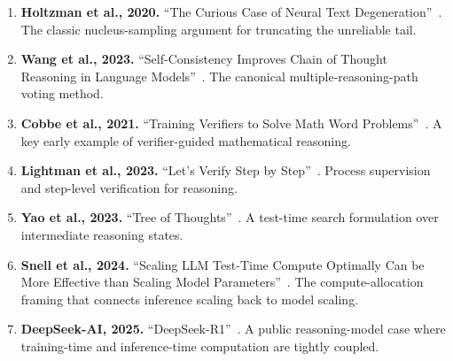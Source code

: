 \begin{enumerate}[nosep]
  \item \textbf{Holtzman et al., 2020.} ``The Curious Case of Neural Text Degeneration''~\cite{holtzman2020curious}. The classic nucleus-sampling argument for truncating the unreliable tail.
  \item \textbf{Wang et al., 2023.} ``Self-Consistency Improves Chain of Thought Reasoning in Language Models''~\cite{wang2022selfconsistency}. The canonical multiple-reasoning-path voting method.
  \item \textbf{Cobbe et al., 2021.} ``Training Verifiers to Solve Math Word Problems''~\cite{cobbe2021gsm8k}. A key early example of verifier-guided mathematical reasoning.
  \item \textbf{Lightman et al., 2023.} ``Let's Verify Step by Step''~\cite{lightman2023verify}. Process supervision and step-level verification for reasoning.
  \item \textbf{Yao et al., 2023.} ``Tree of Thoughts''~\cite{yao2023tree}. A test-time search formulation over intermediate reasoning states.
  \item \textbf{Snell et al., 2024.} ``Scaling LLM Test-Time Compute Optimally Can be More Effective than Scaling Model Parameters''~\cite{snell2024scaling}. The compute-allocation framing that connects inference scaling back to model scaling.
  \item \textbf{DeepSeek-AI, 2025.} ``DeepSeek-R1''~\cite{deepseekai2025r1}. A public reasoning-model case where training-time and inference-time computation are tightly coupled.
\end{enumerate}

\flushbottom
